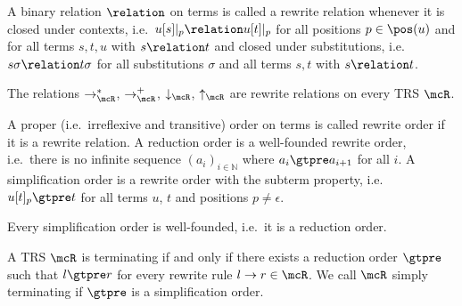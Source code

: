 %
\begin{definition}\label{def:closed-under}
A binary relation $\relation$ on terms is called a {\myem rewrite relation} whenever it is {\myem closed under contexts},
i.e.~$u[s]|_p\relation u[t]|_p$ %
for all positions $p\in\pos(u)$ and
for all terms $s,t,u$ with $s\relation t$
and {\myem closed under substitutions}, 
i.e.~$s\sigma\relation t\sigma$ %
for all substitutions $\sigma$
and all terms $s,t$ with $s\relation t$.
\end{definition}
\begin{lemma}
The relations $\rightarrow^*_\mcR$, 
$\rightarrow^+_\mcR$,
$\downarrow_\mcR$, $\uparrow_\mcR$ are rewrite relations on every TRS $\mcR$.
\end{lemma}
%
\begin{definition}
A proper (i.e.~irreflexive and transitive) order on terms is called {\myem rewrite order} if it is a rewrite relation.
A {\myem reduction order} is a well-founded rewrite order,
i.e.~there is no infinite sequence 
$(a_i)_{i\in\mathbb{N}}$
where $a_i\gtpre a_{i+1}$ for all $i$.
A {\myem simplification order} is a rewrite order with the {\myem subterm property},
i.e.~$u[t]_p \gtpre t$ for all terms $u$, $t$ and positions $p\neq\epsilon$.
\end{definition}
\begin{lemma}
Every simplification order is well-founded, i.e.~it is a reduction order.
\end{lemma}
%
\begin{theorem}
A TRS $\mcR$ is terminating if and only if there exists a reduction order $\gtpre$
such that $l\gtpre r$ for every rewrite rule $l\rightarrow r\in\mcR$.
We call $\mcR$ simply terminating if $\gtpre$ is a simplification order.
\end{theorem}


